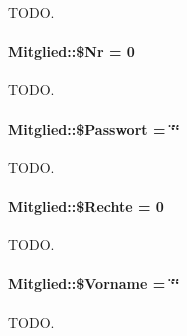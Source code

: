 TODO. 

\hypertarget{classMitglied_113efe44273361b7c167c729666ad04c}{
\paragraph[\$Nr]{\setlength{\rightskip}{0pt plus 5cm}Mitglied::\$Nr = 0}\hfill}
\label{classMitglied_113efe44273361b7c167c729666ad04c}


TODO. 

\hypertarget{classMitglied_94f43b65c468ad42ac45be064d015446}{
\paragraph[\$Passwort]{\setlength{\rightskip}{0pt plus 5cm}Mitglied::\$Passwort = \char`\"{}\char`\"{}}\hfill}
\label{classMitglied_94f43b65c468ad42ac45be064d015446}


TODO. 

\hypertarget{classMitglied_adadc54a72a46a089ddec43855ba3c7e}{
\paragraph[\$Rechte]{\setlength{\rightskip}{0pt plus 5cm}Mitglied::\$Rechte = 0}\hfill}
\label{classMitglied_adadc54a72a46a089ddec43855ba3c7e}


TODO. 

\hypertarget{classMitglied_157424daca1ecda5b6f6a3e0f24ecfce}{
\paragraph[\$Vorname]{\setlength{\rightskip}{0pt plus 5cm}Mitglied::\$Vorname = \char`\"{}\char`\"{}}\hfill}
\label{classMitglied_157424daca1ecda5b6f6a3e0f24ecfce}


TODO. 


